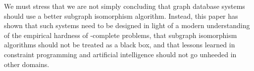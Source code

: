 \documentclass[twoside,11pt]{article}
\begin{document}
We must stress that we are not simply concluding that graph database systems should use a better
subgraph isomorphism algorithm.  Instead, this paper has shown that such systems need to be designed
in light of a modern understanding of the empirical hardness of \NP-complete problems, that subgraph
isomorphism algorithms should not be treated as a black box, and that lessons learned in constraint
programming and artificial intelligence should not go unheeded in other domains.




\end{document}
